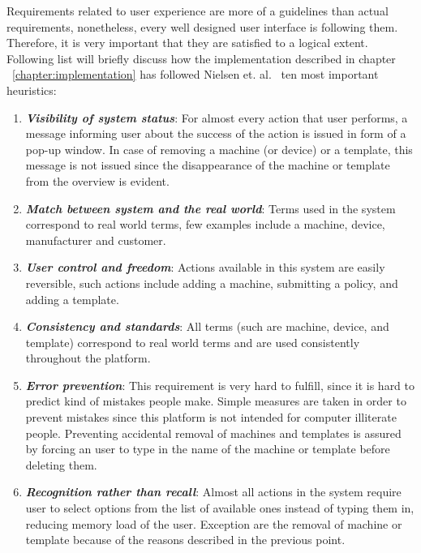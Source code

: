 Requirements related to user experience are more of a guidelines than actual requirements, nonetheless, every well designed user interface is following them. Therefore, it is very important that they are satisfied to a logical extent. Following list will briefly discuss how the implementation described in chapter ~\ref{chapter:implementation} has followed Nielsen et. al.~\cite{nielsen199510} ten most important heuristics:

\begin{enumerate}
	\setlength{\itemsep}{1pt}
	\item \textbf{\textit{Visibility of system status}}: For almost every action that user performs, a message informing user about the success of the action is issued in form of a pop-up window. In case of removing a machine (or device) or a template, this message is not issued since the disappearance of the machine or template from the overview is evident.

	\item \textbf{\textit{Match between system and the real world}}: Terms used in the system correspond to real world terms, few examples include a machine, device, manufacturer and customer. 

	\item \textbf{\textit{User control and freedom}}: Actions available in this system are easily reversible, such actions include adding a machine, submitting a policy, and adding a template.

	\item \textbf{\textit{Consistency and standards}}: All terms (such are machine, device, and template) correspond to real world terms and are used consistently throughout the platform.  

	\item \textbf{\textit{Error prevention}}: This requirement is very hard to fulfill, since it is hard to predict kind of mistakes people make. Simple measures are taken in order to prevent mistakes since this platform is not intended for computer illiterate people. Preventing accidental removal of machines and templates is assured by forcing an user to type in the name of the machine or template before deleting them.

	\item \textbf{\textit{Recognition rather than recall}}: Almost all actions in the system require user to select options from the list of available ones instead of typing them in, reducing memory load of the user. Exception are the removal of machine or template because of the reasons described in the previous point.


\end{enumerate}
